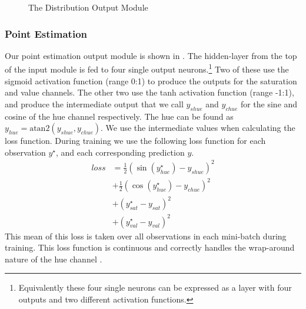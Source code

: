 \documentclass[]{clv3}
\newcommand{\parencite}{\citep}
\begin{document}
\begin{figure}
	\newcommand{\picwidth}{60pt}
	
	\caption{The Distribution Output Module \label{fig:distoutmod}}
\end{figure}


\subsubsection{Point Estimation}\label{sec:point-estimation}
Our point estimation output module is shown in .
The hidden-layer from the top of the input module is fed to  four single output neurons.\footnote{Equivalently these four single neurons can be expressed as a layer with four outputs and two different activation functions.}
Two of these use the sigmoid activation function (range 0:1) to produce the outputs for the saturation and value channels.
The other two use the tanh activation function (range -1:1), and produce the intermediate output that we call $y_{shue}$ and $y_{chue}$ for the sine and cosine of the hue channel respectively.
The hue can be found as $y_{hue} =  \mathrm{atan2} \left(y_{shue}, y_{chue} \right)$.
We use the intermediate values when calculating the loss function.
During training we use the following loss function for each observation $y^\star$, and each corresponding prediction $y$.
\begin{align}
loss &= %
\frac{1}{2} \left(\sin(y^\star_{hue}) - y_{shue} \right)^2     \nonumber \\
&+ \frac{1}{2} \left(\cos(y^\star_{hue}) - y_{chue} \right)^2  \nonumber \\
&+ \left(y^\star_{sat} - y_{sat} \right)^2  \nonumber \\
&+ \left(y^\star_{val} - y_{val} \right)^2 %
\end{align}
This mean of this loss is taken over all observations in each mini-batch during training.
This loss function is continuous and correctly handles the wrap-around nature of the hue channel \parencite{WhiteRepresentingAnglesSE}.
\end{document}
